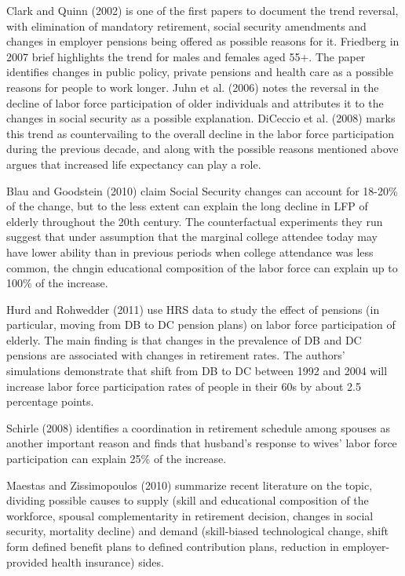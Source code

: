 \documentclass[
10pt, %
a4paper, %
oneside, %
headinclude,footinclude, %
BCOR5mm, %
]{scrartcl}
\begin{document}
Clark and Quinn (2002\cite{Clark2002}) is one of the first papers to document the trend reversal, with elimination of mandatory retirement,  social security amendments and changes in employer pensions being offered as possible reasons for it. Friedberg in 2007\cite{Friedberg2007} brief highlights the trend for males and females aged 55+. The paper identifies changes in public policy, private pensions and health care as a possible reasons for people to work longer. Juhn et al. (2006\cite{Juhn2006}) notes the reversal in the decline of labor force participation of older individuals and attributes it to the changes in social security as a possible explanation. DiCeccio et al. (2008\cite{DiCecio2008}) marks this trend as countervailing to the overall decline in the labor force participation during the previous decade, and along with the possible reasons mentioned above argues that increased life expectancy can play a role. 

Blau and Goodstein (2010\cite{Blau2010}) claim Social Security changes can account for 18-20\% of the change, but to the less extent  can explain the long decline in LFP of elderly throughout the 20th century. The counterfactual experiments they run suggest that under assumption that the marginal college attendee today may have lower ability than in previous periods when college attendance was less common, the chngin educational composition of the labor force can explain up to 100\% of the increase. 

Hurd and Rohwedder (2011\cite{Hurd2011}) use HRS data to study the effect of pensions (in particular, moving from DB to DC pension plans) on labor force participation of elderly. The main finding is that changes in the prevalence of DB and DC pensions are associated with changes in retirement rates. The authors' simulations demonstrate that shift from DB to DC between 1992 and 2004 will increase labor force participation rates of people in their 60s by about 2.5 percentage points.

Schirle (2008\cite{Schirle2008}) identifies a coordination in retirement schedule among spouses as another important reason and finds that husband's response to wives' labor force participation can explain 25\% of the increase.

Maestas and Zissimopoulos (2010\cite{Maestas2010}) summarize recent literature on the topic, dividing possible causes to supply (skill and educational composition of the workforce, spousal complementarity in retirement decision, changes in social security, mortality decline) and demand (skill-biased technological change, shift form defined benefit plans to defined contribution plans, reduction in employer-provided health insurance) sides.
\end{document}
